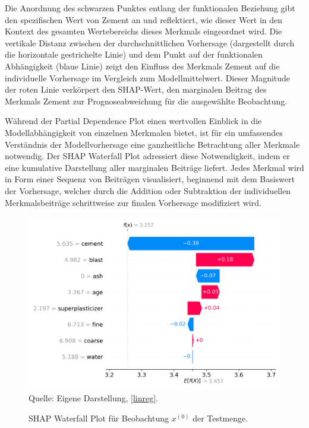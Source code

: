 Die Anordnung des schwarzen Punktes entlang der funktionalen Beziehung gibt den spezifischen Wert 
von Zement an und reflektiert, wie dieser Wert in den Kontext des gesamten Wertebereichs dieses Merkmals 
eingeordnet wird. Die vertikale Distanz zwischen der durchschnittlichen Vorhersage (dargestellt durch die horizontale 
gestrichelte Linie) und dem Punkt auf der funktionalen Abhängigkeit (blaue Linie) zeigt den Einfluss des Merkmals 
Zement auf die individuelle Vorhersage im Vergleich zum Modellmittelwert. Dieser Magnitude der roten Linie verkörpert den SHAP-Wert,
den marginalen Beitrag des Merkmals Zement zur Prognoseabweichung für die ausgewählte Beobachtung.

Während der Partial Dependence Plot einen wertvollen Einblick in die Modellabhängigkeit von 
einzelnen Merkmalen bietet, ist für ein umfassendes Verständnis der Modellvorhersage eine ganzheitliche 
Betrachtung aller Merkmale notwendig. Der SHAP Waterfall Plot adressiert diese Notwendigkeit, 
indem er eine kumulative Darstellung aller marginalen Beiträge liefert. Jedes Merkmal wird in 
Form einer Sequenz von Beiträgen visualisiert, beginnend mit dem Basiswert der Vorhersage, welcher 
durch die Addition oder Subtraktion der individuellen Merkmalsbeiträge schrittweise zur finalen Vorhersage 
modifiziert wird.

\begin{figure}[!h]
    \caption{SHAP Waterfall Plot für Beobachtung $x^{(0)}$ der Testmenge.}
    \includegraphics[width=1\textwidth]{../scripts/images/shap_waterfall_plot.png}
    Quelle: Eigene Darstellung, \ref{linreg}.
    \label{pic:shap_waterfall}
\end{figure}

